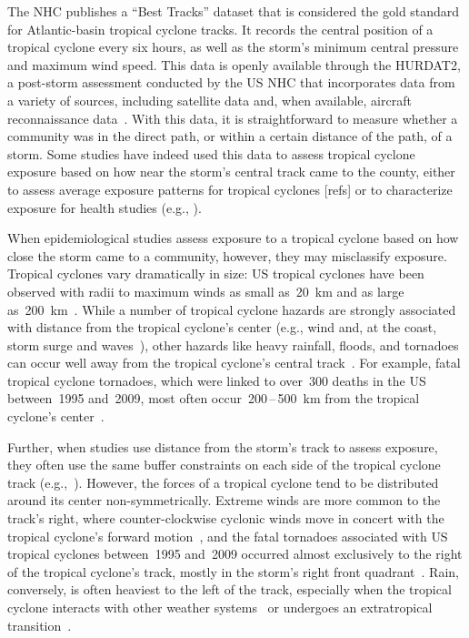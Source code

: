 The \ac{NHC} publishes a ``Best Tracks'' dataset that is considered the gold
standard for Atlantic-basin tropical cyclone tracks.  It records the central
position of a tropical cyclone every six hours, as well as the storm's minimum
central pressure and maximum wind speed.  This data is openly available through
the \ac{HURDAT2}, a post-storm assessment conducted by the \ac{US} \ac{NHC}
that incorporates data from a variety of sources, including satellite data and,
when available, aircraft reconnaissance data~\parencite{landsea2013,
jarvinen1988}. With this data, it is straightforward to measure whether a
community was in the direct path, or within a certain distance of the path, of
a storm. Some studies have indeed used this data to assess tropical cyclone
exposure based on how near the storm's central track came to the county, either
to assess average exposure patterns for tropical cyclones [refs] or to
characterize exposure for health studies (e.g., \cite{currie2013}).

When epidemiological studies assess exposure to a tropical cyclone based on 
how close the storm came to a community, however, they may misclassify exposure. 
Tropical cyclones vary dramatically in size: \ac{US} tropical
cyclones have been observed with radii to maximum winds as small
as~20~\si{\kilo\metre} and as large
as~200~\si{\kilo\metre}~\parencite{mallin2006, quiring2011variations}.  While a
number of tropical cyclone hazards are strongly associated with distance from
the tropical cyclone's center (e.g., wind and, at the coast, storm surge and
waves~\parencite{rappaport2000, kruk2010}), other hazards like heavy rainfall,
floods, and tornadoes can occur well away from the tropical cyclone's central
track~\parencite{rappaport2000, atallah2007, moore2012}.  For example, fatal
tropical cyclone tornadoes, which were linked to over~300 deaths in the \ac{US}
between~1995 and~2009, most often occur~200\,--\,500~\si{\kilo\metre} from the
tropical cyclone's center~\parencite{moore2012}.  

Further, when studies use distance from the storm's track to assess exposure,
they often use the same buffer constraints on each side of the tropical cyclone
track (e.g.,~\cite{czajkowski2011, zandbergen2009, grabich2015measuring,
tansel2010, currie2013}). However, the forces of a tropical cyclone tend to be
distributed around its center non-symmetrically. Extreme winds are more common
to the track's right, where counter-clockwise cyclonic winds move in concert
with the tropical cyclone's forward motion~\parencite{halverson2015}, and the
fatal tornadoes associated with \ac{US} tropical cyclones between~1995 and~2009
occurred almost exclusively to the right of the tropical cyclone's track,
mostly in the storm's right front quadrant~\parencite{moore2012}. Rain,
conversely, is often heaviest to the left of the track, especially when the
tropical cyclone interacts with other weather systems~\parencite{atallah2003,
atallah2007, zhu2013variations} or undergoes an extratropical
transition~\parencite{elsberry2002}.

